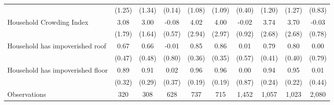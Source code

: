 \begin{tabular}{l*{9}c}
&(1.25)&(1.34)&(0.14)&(1.08)&(1.09)&(0.40)&(1.20)&(1.27)&(0.83)\\
Household Crowding Index&3.08&3.00&-0.08&4.02&4.00&-0.02&3.74&3.70&-0.03\\
&(1.79)&(1.64)&(0.57)&(2.94)&(2.97)&(0.92)&(2.68)&(2.68)&(0.78)\\
Household has impoverished roof&0.67&0.66&-0.01&0.85&0.86&0.01&0.79&0.80&0.00\\
&(0.47)&(0.48)&(0.80)&(0.36)&(0.35)&(0.57)&(0.41)&(0.40)&(0.79)\\
Household has impoverished floor&0.89&0.91&0.02&0.96&0.96&0.00&0.94&0.95&0.01\\
&(0.32)&(0.29)&(0.37)&(0.19)&(0.19)&(0.87)&(0.24)&(0.22)&(0.44)\\
\hline
Observations & 320 & 308 & 628 & 737 & 715 & 1,452 & 1,057 & 1,023 & 2,080 \\
\hline\hline
\end{tabular}
